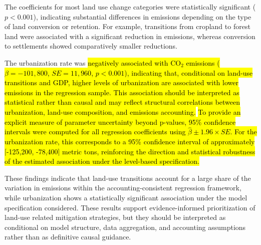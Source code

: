 \documentclass[10pt,letterpaper]{article}
\begin{document}
 
 The coefficients for most land use change categories were statistically significant ($p < 0.001$), indicating substantial differences in emissions depending on the type of land conversion or retention. For example, transitions from cropland to forest land were associated with a significant reduction in emissions, whereas conversion to settlements showed comparatively smaller reductions.

The urbanization rate was \hl{negatively associated with CO$_2$ emissions ($\beta = -101{,}800$, $SE = 11{,}960$, $p < 0.001$), indicating that, conditional on land-use transitions and GDP, higher levels of urbanization are associated with lower emissions in the regression sample. This association should be interpreted as statistical rather than causal and may reflect structural correlations between urbanization, land-use composition, and emissions accounting.} 
\hl{To provide an explicit measure of parameter uncertainty beyond p-values, 95\% confidence intervals were computed for all regression coefficients using $\hat{\beta} \pm 1.96 \times SE$.  For the urbanization rate, this corresponds to a 95\% confidence interval of approximately [-125,200, -78,400] metric tons, reinforcing the direction and statistical robustness of the estimated association under the level-based specification.}


These findings indicate that land-use transitions account for a large share of the variation in emissions within the accounting-consistent regression framework, while urbanization shows a statistically significant association under the model specification considered. These results support evidence-informed prioritization of land-use related mitigation strategies, but they should be interpreted as conditional on model structure, data aggregation, and accounting assumptions rather than as definitive causal guidance.

\end{document}

